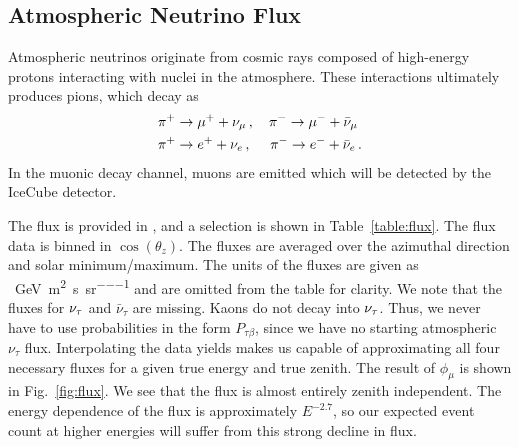 \subsection{Atmospheric Neutrino Flux}
Atmospheric neutrinos originate from cosmic rays composed of high-energy protons interacting with nuclei in the atmosphere.
These interactions ultimately produces pions, which decay as 
\begin{align}\label{eq:pion} %
    &\pi^+ \to \mu^+ + \nm\,, \quad \pi^- \to \mu^- + \anm \nonumber \\
    &\pi^+ \to e^+ + \ne\,,\,\, \quad \pi^- \to e^- + \ane\,.
\end{align}
In the muonic decay channel, muons are emitted which will be detected by the IceCube detector.

The flux is provided in \cite{hondaData,hondaArticle}, and a selection is shown in Table~\ref{table:flux}.
The flux data is binned in $\cos(\theta_z)$. The fluxes are averaged over the azimuthal direction and solar minimum/maximum. 
The units of the fluxes are given as \si{\per\GeV \per\metre\squared \per\second \per\steradian} and are omitted
from the table for clarity. 
We note that the fluxes for $\nu_\tau$ and $\bar{\nu}_{\tau}$ are missing. Kaons do not decay into $\nu_\tau$. Thus, we never have to use probabilities in the form 
$P_{\tau \beta}$, since we have no starting atmospheric $\nu_\tau$ flux. 
Interpolating the data yields makes us capable of approximating all four necessary fluxes for a given true energy and true zenith.
The result of $\phi_\mu$ is shown in Fig.~\ref{fig:flux}. We see that the flux is almost entirely zenith independent. 
The energy dependence of the flux is approximately $E^{-2.7}$, so our expected event count at higher energies will suffer from this strong decline in flux.

